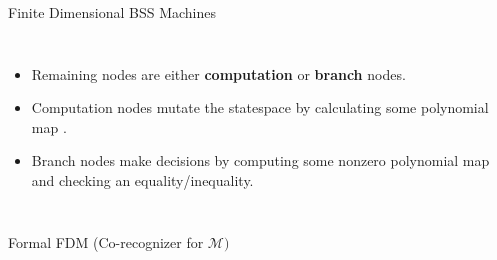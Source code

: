 \documentclass[c]{beamer}
\begin{document}
\begin{frame}{Finite Dimensional BSS Machines}
  
  \begin{columns}
    
    \begin{itemize}
    \item Remaining nodes are either \textbf{computation} or
      \textbf{branch} nodes.
    \item Computation nodes mutate the statespace by calculating some
      polynomial map .
    \item Branch nodes make decisions by computing some nonzero
      polynomial map  and checking an equality/inequality.

    \end{itemize}
    \scaletopagewidth[.9]{\mandelrecpII{}}
    
  \end{columns}
  
 \end{frame}

\begin{frame}{Formal FDM (Co-recognizer for $\mathcal{M})$}
  
  \begin{columns}
    \begin{center}
      \scaletopagewidth[.9]{\mandlegend{}}
    \end{center}
    
    \begin{center}
      \scaletopagewidth[.9]{\mandelrecfull{}}
    \end{center}
  \end{columns}

\end{frame}
\end{document}
